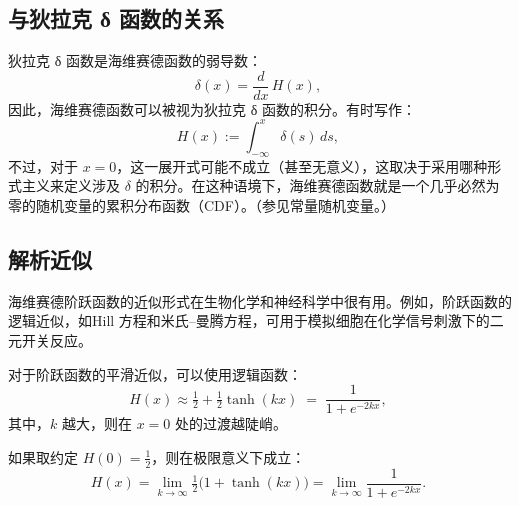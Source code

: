 \subsection{与狄拉克 δ 函数的关系}
狄拉克 δ 函数是海维赛德函数的弱导数：
$$
\delta(x) = \frac{d}{dx}\, H(x),~
$$
因此，海维赛德函数可以被视为狄拉克 δ 函数的积分。有时写作：
$$
H(x) := \int_{-\infty}^{x} \delta(s)\, ds,~
$$
不过，对于 $x = 0$，这一展开式可能不成立（甚至无意义），这取决于采用哪种形式主义来定义涉及 $\delta$ 的积分。在这种语境下，海维赛德函数就是一个几乎必然为零的随机变量的累积分布函数（CDF）。（参见常量随机变量。）
\subsection{解析近似}
海维赛德阶跃函数的近似形式在生物化学和神经科学中很有用。例如，阶跃函数的逻辑近似，如Hill 方程和米氏–曼腾方程，可用于模拟细胞在化学信号刺激下的二元开关反应。

对于阶跃函数的平滑近似，可以使用逻辑函数：
$$
H(x) \approx \tfrac{1}{2} + \tfrac{1}{2}\tanh(kx) \;=\; \frac{1}{1 + e^{-2kx}},~
$$
其中，$k$ 越大，则在 $x = 0$ 处的过渡越陡峭。

如果取约定 $H(0) = \tfrac{1}{2}$，则在极限意义下成立：
$$
H(x) = \lim_{k \to \infty} \tfrac{1}{2}\bigl(1 + \tanh(kx)\bigr) 
= \lim_{k \to \infty} \frac{1}{1 + e^{-2kx}}.~
$$
